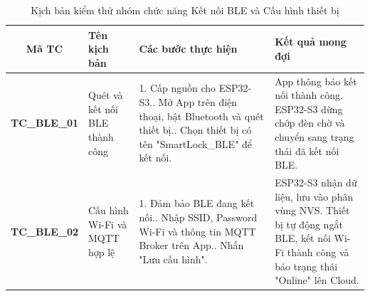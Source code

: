 \begin{table}[H]
    \centering
    \caption{Kịch bản kiểm thử nhóm chức năng Kết nối BLE và Cấu hình thiết bị}
    \label{tab:tc_ble}
    \small
    \begin{tabularx}{\textwidth}{|c|X|X|X|}
\hline
\textbf{Mã TC} & \textbf{Tên kịch bản} & \textbf{Các bước thực hiện} & \textbf{Kết quả mong đợi} \\
\hline
\textbf{TC\_BLE\_01} & Quét và kết nối BLE thành công &
1. Cấp nguồn cho ESP32-S3.\newline
2. Mở App trên điện thoại, bật Bluetooth và quét thiết bị.\newline
3. Chọn thiết bị có tên "SmartLock\_BLE" để kết nối. &
App thông báo kết nối thành công. ESP32-S3 dừng chớp đèn chờ và chuyển sang trạng thái đã kết nối BLE. \\
\hline
\textbf{TC\_BLE\_02} & Cấu hình Wi-Fi và MQTT hợp lệ &
1. Đảm bảo BLE đang kết nối.\newline
2. Nhập SSID, Password Wi-Fi và thông tin MQTT Broker trên App.\newline
3. Nhấn "Lưu cấu hình". &
ESP32-S3 nhận dữ liệu, lưu vào phân vùng NVS. Thiết bị tự động ngắt BLE, kết nối Wi-Fi thành công và báo trạng thái "Online" lên Cloud. \\
\hline
    \end{tabularx}
\end{table}